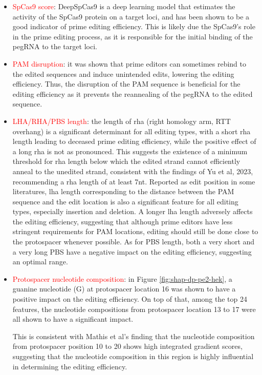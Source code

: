 \begin{itemize}[itemsep=-0mm]
    \item \textcolor{red}{SpCas9 score}: DeepSpCas9 is a deep learning model that estimates the activity of the SpCas9 protein on a target loci, and has been shown to be a good indicator of prime editing efficiency\cite{kimPredictingEfficiencyPrime2021}. This is likely due the SpCas9's role in the prime editing process, as it is responsible for the initial binding of the pegRNA to the target loci. 
    \item \textcolor{red}{PAM disruption}: it was shown that prime editors can sometimes rebind to the edited sequences and induce unintended edits, lowering the editing efficiency\cite{liudavidr.SearchandreplaceGenomeEditing2019}. Thus, the disruption of the PAM sequence is beneficial for the editing efficiency as it prevents the reannealing of the pegRNA to the edited sequence.
    \item \textcolor{red}{LHA/RHA/PBS length}: the length of rha (right homology arm, RTT overhang) is a significant determinant for all editing types, with a short rha length leading to deceased prime editing efficiency, while the positive effect of a long rha is not as pronounced. This suggests the existence of a minimum threshold for rha length below which the edited strand cannot efficiently anneal to the unedited strand, consistent with the findings of Yu et al, 2023, recommending a rha length of at least 7nt\cite{yuPredictionEfficienciesDiverse2023}. Reported as edit position in some literatures, lha length corresponding to the distance between the PAM sequence and the edit location is also a significant feature for all editing types, especially insertion and deletion. A longer lha length adversely affects the editing efficiency, suggesting that although prime editors have less stringent requirements for PAM locations, editing should still be done close to the protospacer whenever possible. As for PBS length, both a very short and a very long PBS have a negative impact on the editing efficiency, suggesting an optimal range.
    \item \textcolor{red}{Protospacer nucleotide composition}: in Figure \ref{fig:shap-dp-pe2-hek}, a guanine nucleotide (G) at protospacer location 16 was shown to have a positive impact on the editing efficiency. On top of that, among the top 24 features, the nucleotide compositions from protospacer location 13 to 17 were all shown to have a significant impact. 
    
    This is consistent with Mathis et al's finding that the nucleotide composition from protospacer position 10 to 20 shows high integrated gradient scores, suggesting that the nucleotide composition in this region is highly influential in determining the editing efficiency\cite{mathisPredictingPrimeEditing2023}.
\end{itemize}


